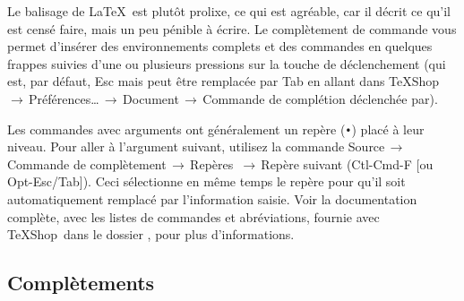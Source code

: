 \documentclass[11pt,french]{article}
\newcommand{\TS}{\textsf{\TeX Shop}}
\newcommand{\cmd}[1]{\textsf{#1}}
\newcommand{\mnu}[1]{\textsf{#1}}
\newcommand{\To}{\,\(\to\)\,}
\begin{document}
Le balisage de \LaTeX\ est plutôt prolixe, ce qui est agréable, car il décrit ce qu'il est censé faire, mais un peu pénible à écrire. Le complètement de commande vous permet d'insérer des environnements complets et des commandes en quelques frappes suivies d'une ou plusieurs pressions  sur la touche de déclenchement (qui est, par défaut, \cmd{Esc} mais peut être remplacée par \cmd{Tab} en allant dans \mnu{TeXShop}\To\mnu{Préférences…}\To\mnu{Document}\To\mnu{Commande de complétion déclenchée par}).

Les commandes avec arguments ont généralement un repère (\texttt{•}) placé à leur niveau. Pour aller à l'argument suivant, utilisez la commande \mnu{Source}\To\mnu{Commande de complètement}\To\mnu{Repères} \To\mnu{Repère suivant} (\cmd{Ctl-Cmd-F} [ou \cmd{Opt-Esc/Tab}]). Ceci sélectionne en même temps le repère pour qu'il soit automatiquement remplacé par l'information saisie. Voir la documentation complète, avec les listes de commandes et abréviations, fournie avec \TS\ dans le dossier , pour plus d'informations.



\subsection{Complètements}
\end{document}
